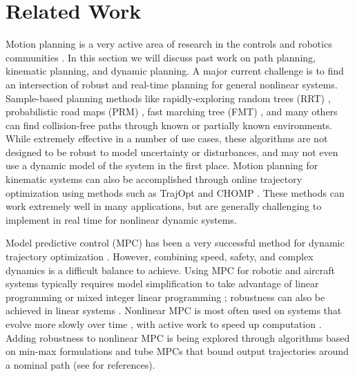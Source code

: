 \section{Related Work \label{sec:relatedwork}}
Motion planning is a very active area of research in the controls and robotics communities \cite{Hoy2015}.  In this section we will discuss past work on path planning, kinematic planning, and dynamic planning.  A major current challenge is to find an intersection of robust and real-time planning for general nonlinear systems. 
Sample-based planning methods like rapidly-exploring random trees (RRT) \cite{Kuffner2000}, probabilistic road maps (PRM) \cite{Kavraki1996}, fast marching tree (FMT) \cite{Janson2015}, and many others \cite{Richter2016, Karaman2011, Kobilarov2012} can find collision-free paths through known or partially known environments. While extremely effective in a number of use cases, these algorithms are not designed to be robust to model uncertainty or disturbances, and may not even use a dynamic model of the system in the first place.
Motion planning for kinematic systems can also be accomplished through online trajectory optimization using methods such as TrajOpt \cite{Schulman2013} and CHOMP \cite{Ratliff2009}. These methods can work extremely well in many applications, but are generally challenging to implement in real time for nonlinear dynamic systems.

Model predictive control (MPC) has been a very successful method for dynamic trajectory optimization \cite{Qin2003}.  However, combining speed, safety, and complex dynamics is a difficult balance to achieve. Using MPC for robotic and aircraft systems typically requires model simplification to take advantage of linear programming or mixed integer linear programming \cite{Vitus2008, Zeilinger2011, Richter2012}; robustness can also be achieved in linear systems \cite{Richards2006, DiCairano2016}. Nonlinear MPC is most often used on systems that evolve more slowly over time \cite{Diehl2002, Schildbach2016}, with active work to speed up computation \cite{Diehl2009, Neunert2016}. Adding robustness to nonlinear MPC is being explored through algorithms based on min-max formulations and tube MPCs that bound output trajectories around a nominal path (see \cite{Hoy2015} for references).


